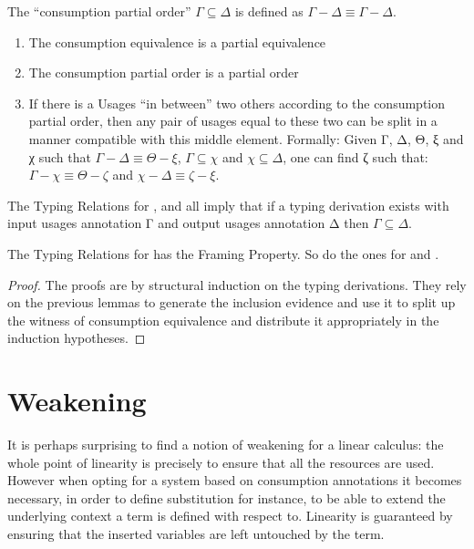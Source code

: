 \documentclass[a4paper,UKenglish]{lipics-v2016}
\begin{document}
\begin{definition}The ``consumption partial order'' $Γ ⊆ Δ$ is defined as
$Γ - Δ ≡ Γ - Δ$.
\end{definition}

\begin{lemma}
\begin{enumerate}
  \item The consumption equivalence is a partial equivalence
  \item The consumption partial order is a partial order
  \item If there is a Usages ``in between'' two others according to the consumption
        partial order, then any pair of usages equal to these two can be split in a
        manner compatible with this middle element. Formally: Given Γ, Δ, Θ, ξ
        and χ such that $Γ - Δ ≡ Θ - ξ$, $Γ ⊆ χ$ and $χ ⊆ Δ$,
        one can find ζ such that: $Γ - χ ≡ Θ - ζ$ and $χ - Δ ≡ ζ - ξ$.
\end{enumerate}
\end{lemma}

\begin{lemma}[Consumption]The Typing Relations for \Var{}, \Inferable{}
and \Checkable{} all imply that if a typing derivation exists with input
usages annotation Γ and output usages annotation Δ then $Γ ⊆ Δ$.
\end{lemma}

\begin{theorem}
\label{theorem:framing}
The Typing Relations for \Var{} has the Framing Property.
So do the ones for \Inferable{} and \Checkable{}.
\end{theorem}
\begin{proof}
The proofs are by structural induction on the typing derivations.
They rely on the previous lemmas to generate the inclusion evidence
and use it to split up the witness of consumption equivalence and
distribute it appropriately in the induction hypotheses.
\end{proof}


\section{Weakening}

It is perhaps surprising to find a notion of weakening for a linear
calculus: the whole point of linearity is precisely to ensure that
all the resources are used. However when opting for a system based
on consumption annotations it becomes necessary, in order to define
substitution for instance, to be able to extend the underlying
context a term is defined with respect to. Linearity is guaranteed
by ensuring that the inserted variables are left untouched by the
term.
\end{document}
